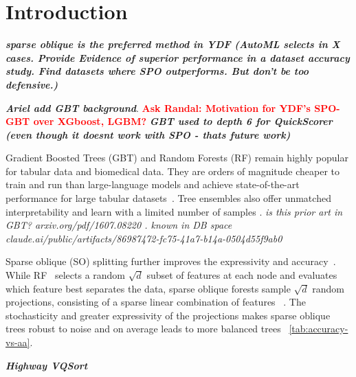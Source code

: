 \documentclass[sigconf,anonymous,review]{acmart}
\newcommand{\TODO}[1]{\textbf{\textcolor{red}{#1}}}
\begin{document}


\section{Introduction}


\textbf{\textit{sparse oblique is the preferred method in YDF (AutoML selects in X cases. Provide Evidence of superior performance in a dataset accuracy study. Find datasets where SPO outperforms. But don't be too defensive.)} }

\textbf{\textit{Ariel add GBT background}}. \TODO{Ask Randal: Motivation for YDF's SPO-GBT over XGboost, LGBM?} \textbf{\textit{GBT used to depth 6 for QuickScorer (even though it doesnt work with SPO - thats future work)}}

Gradient Boosted Trees (GBT) and Random Forests (RF) remain highly popular for tabular data and biomedical data. They are orders of magnitude cheaper to train and run than large-language models and achieve state-of-the-art performance for large tabular datasets~\cite{grinsztajn2022tree,shwartz2022tabular,mcelfresh2023neural}. Tree ensembles also offer unmatched interpretability and learn with a limited number of samples \cite{delgado2014}. \textit{is this prior art in GBT? arxiv.org/pdf/1607.08220 . known in DB space claude.ai/public/artifacts/86987472-fc75-41a7-b14a-0504d55f9ab0}


Sparse oblique (SO) splitting further improves the expressivity and accuracy~\cite{tomita2020sparse}. While RF~\cite{breiman} selects a random $\sqrt{d}$ subset of features at each node and evaluates which feature best separates the data, sparse oblique forests sample $\sqrt{d}$ random projections, consisting of a sparse linear combination of features ~\cite{tomita2020sparse}. The stochasticity and greater expressivity of the projections makes sparse oblique trees robust to noise and on average leads to more balanced trees~\cite{tomita2020sparse} \ref{tab:accuracy-vs-aa}.

\textbf{\textit{Highway VQSort \cite{https://arxiv.org/pdf/2205.05982}}}
\end{document}
